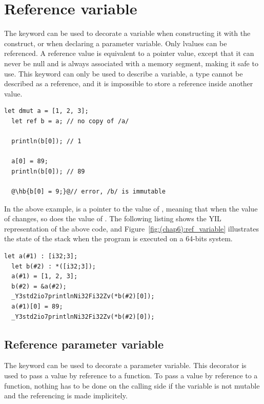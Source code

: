 \section {Reference variable}
\label{sec:ref_variable}

The  keyword can be used to decorate a variable when constructing it
with the  construct, or when declaring a parameter variable. Only
lvalues can be referenced. A reference value is equivalent to a pointer value,
except that it can never be null and is always associated with a memory segment,
making it safe to use. This keyword can only be used to describe a variable, a
type cannot be described as a reference, and it is impossible to store a
reference inside another value.

\begin{lstlisting}[style=coloredverbatimError, escapechar=@]
  let dmut a = [1, 2, 3];
  let ref b = a; // no copy of /a/

  println(b[0]); // 1

  a[0] = 89;
  println(b[0]); // 89

  @\hb{b[0] = 9;}@// error, /b/ is immutable
\end{lstlisting}

In the above example,  is a pointer to the value of ,
meaning that when the value of  changes, so does the value of
. The following listing shows the YIL representation of the above
code, and Figure~\ref{fig:(chap6):ref_variable} illustrates the state of the stack when the
program is executed on a 64-bits system.

\begin{lstlisting}[style=lyilVerb]
  let a(#1) : [i32;3];
  let b(#2) : *([i32;3]);
  a(#1) = [1, 2, 3];
  b(#2) = &a(#2);
  _Y3std2io7printlnNi32Fi32Zv(*b(#2)[0]);
  a(#1)[0] = 89;
  _Y3std2io7printlnNi32Fi32Zv(*b(#2)[0]);
\end{lstlisting}



\subsection{Reference parameter variable}
\label{sec:ref_param}

The  keyword can be used to decorate a parameter variable. This
decorator is used to pass a value by reference to a function. To pass a value by
reference to a function, nothing has to be done on the calling side if the
variable is not mutable and the referencing is made implicitely.

